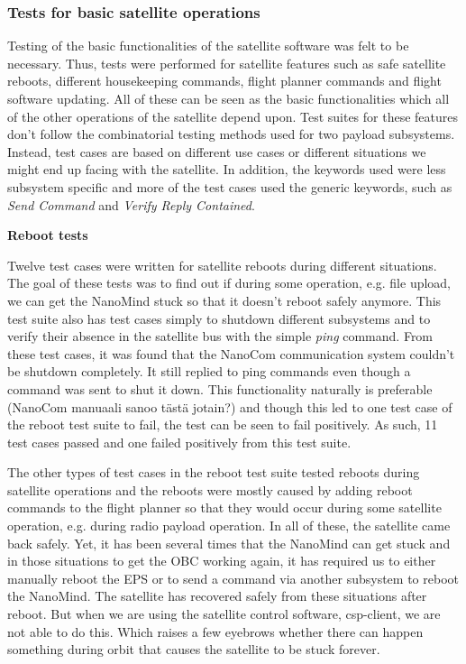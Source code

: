 \documentclass[english,12pt,a4paper,pdftex,elec,utf8]{aaltothesis}
\begin{document}
\subsubsection{Tests for basic satellite operations}
Testing of the basic functionalities of the satellite software was felt to be necessary. Thus, tests were performed for satellite features such as safe satellite reboots, different housekeeping commands, flight planner commands and flight software updating. All of these can be seen as the basic functionalities which all of the other operations of the satellite depend upon. Test suites for these features don't follow the combinatorial testing methods used for two payload subsystems. Instead, test cases are based on different use cases or different situations we might end up facing with the satellite. In addition, the keywords used were less subsystem specific and more of the test cases used the generic keywords, such as \textit{Send Command} and \textit{Verify Reply Contained}.\par
\textbf{Reboot tests}
\par 
Twelve test cases were written for satellite reboots during different situations. The goal of these tests was to find out if during some operation, e.g. file upload, we can get the NanoMind stuck so that it doesn't reboot safely anymore. This test suite also has test cases simply to shutdown different subsystems and to verify their absence in the satellite bus with the simple \textit{ping} command. From these test cases, it was found that the NanoCom communication system couldn't be shutdown completely. It still replied to ping commands even though a command was sent to shut it down. This functionality naturally is preferable (NanoCom manuaali sanoo tästä jotain?) and though this led to one test case of the reboot test suite to fail, the test can be seen to fail positively. As such, 11 test cases passed and one failed positively from this test suite. \par
The other types of test cases in the reboot test suite tested reboots during satellite operations and the reboots were mostly caused by adding reboot commands to the flight planner so that they would occur during some satellite operation, e.g. during radio payload operation. In all of these, the satellite came back safely. Yet, it has been several times that the NanoMind can get stuck and in those situations to get the OBC working again, it has required us to either manually reboot the EPS or to send a command via another subsystem to reboot the NanoMind. The satellite has recovered safely from these situations after reboot. But when we are using the satellite control software, csp-client, we are not able to do this. Which raises a few eyebrows whether there can happen something during orbit that causes the satellite to be stuck forever.\par
\end{document}
